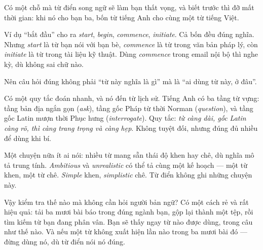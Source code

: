 \documentclass[../../english.tex]{subfiles}
\begin{document}
\begin{dongian}
Có một chỗ mà từ điển song ngữ sẽ làm bạn thất vọng, và biết trước thì đỡ mất thời gian: khi nó cho bạn ba, bốn từ tiếng Anh cho cùng một từ tiếng Việt.

Ví dụ ``bắt đầu'' cho ra \emph{start}, \emph{begin}, \emph{commence}, \emph{initiate}. Cả bốn đều đúng nghĩa. Nhưng \emph{start} là từ bạn nói với bạn bè, \emph{commence} là từ trong văn bản pháp lý, còn \emph{initiate} là từ trong tài liệu kỹ thuật. Dùng \emph{commence} trong email nội bộ thì nghe kỳ, dù không sai chữ nào.

Nên câu hỏi đúng không phải ``từ này nghĩa là gì'' mà là ``ai dùng từ này, ở đâu''.

Có một quy tắc đoán nhanh, và nó đến từ lịch sử. Tiếng Anh có ba tầng từ vựng: tầng bản địa ngắn gọn (\emph{ask}), tầng gốc Pháp từ thời Norman (\emph{question}), và tầng gốc Latin mượn thời Phục hưng (\emph{interrogate}). Quy tắc: \emph{từ càng dài, gốc Latin càng rõ, thì càng trang trọng và càng hẹp}. Không tuyệt đối, nhưng đúng đủ nhiều để dùng khi bí.

Một chuyện nữa ít ai nói: nhiều từ mang sẵn thái độ khen hay chê, dù nghĩa mô tả trung tính. \emph{Ambitious} và \emph{unrealistic} có thể tả cùng một kế hoạch --- một từ khen, một từ chê. \emph{Simple} khen, \emph{simplistic} chê. Từ điển không ghi những chuyện này.

Vậy kiểm tra thế nào mà không cần hỏi người bản ngữ? Có một cách rẻ và rất hiệu quả: tải ba mươi bài báo trong đúng ngành bạn, gộp lại thành một tệp, rồi tìm kiếm từ bạn đang phân vân. Bạn sẽ thấy ngay từ nào được dùng, trong câu như thế nào. Và nếu một từ không xuất hiện lần nào trong ba mươi bài đó --- đừng dùng nó, dù từ điển nói nó đúng.
\end{dongian}
\end{document}
